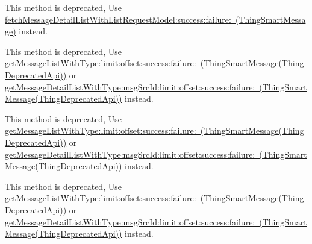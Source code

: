 \begin{DoxyRefList}
\label{deprecated__deprecated000193}%
%
This method is deprecated, Use \mbox{\hyperlink{interface_thing_smart_message_a2162807248d2106bef0a8c7906fc4413}{fetch\+Message\+Detail\+List\+With\+List\+Request\+Model\+:success\+:failure\+: (\+Thing\+Smart\+Message)}} instead.  
\item[(Thing\+Deprecated\+Api) Member \mbox{\hyperlink{category_thing_smart_message_07_thing_deprecated_api_08_a0c22bbecbecc6edecbf9747e11e1216b}{\mbox{[}Thing\+Smart\+Message(Thing\+Deprecated\+Api) get\+Message\+List\+:failure\+:\mbox{]}}} ]\label{deprecated__deprecated000187}%
%
This method is deprecated, Use \mbox{\hyperlink{category_thing_smart_message_07_thing_deprecated_api_08_ada5616d3a613a6453fe4208ef875df7a}{get\+Message\+List\+With\+Type\+:limit\+:offset\+:success\+:failure\+: (\+Thing\+Smart\+Message(\+Thing\+Deprecated\+Api))}} or \mbox{\hyperlink{category_thing_smart_message_07_thing_deprecated_api_08_a63f107a2e407d2a7bd110b38b716129b}{get\+Message\+Detail\+List\+With\+Type\+:msg\+Src\+Id\+:limit\+:offset\+:success\+:failure\+: (\+Thing\+Smart\+Message(\+Thing\+Deprecated\+Api))}} instead. 

\label{deprecated__deprecated000194}%
%
This method is deprecated, Use \mbox{\hyperlink{category_thing_smart_message_07_thing_deprecated_api_08_ada5616d3a613a6453fe4208ef875df7a}{get\+Message\+List\+With\+Type\+:limit\+:offset\+:success\+:failure\+: (\+Thing\+Smart\+Message(\+Thing\+Deprecated\+Api))}} or \mbox{\hyperlink{category_thing_smart_message_07_thing_deprecated_api_08_a63f107a2e407d2a7bd110b38b716129b}{get\+Message\+Detail\+List\+With\+Type\+:msg\+Src\+Id\+:limit\+:offset\+:success\+:failure\+: (\+Thing\+Smart\+Message(\+Thing\+Deprecated\+Api))}} instead. 

\label{deprecated__deprecated000173}%
%
This method is deprecated, Use \mbox{\hyperlink{category_thing_smart_message_07_thing_deprecated_api_08_ada5616d3a613a6453fe4208ef875df7a}{get\+Message\+List\+With\+Type\+:limit\+:offset\+:success\+:failure\+: (\+Thing\+Smart\+Message(\+Thing\+Deprecated\+Api))}} or \mbox{\hyperlink{category_thing_smart_message_07_thing_deprecated_api_08_a63f107a2e407d2a7bd110b38b716129b}{get\+Message\+Detail\+List\+With\+Type\+:msg\+Src\+Id\+:limit\+:offset\+:success\+:failure\+: (\+Thing\+Smart\+Message(\+Thing\+Deprecated\+Api))}} instead. 


\end{DoxyRefList}
